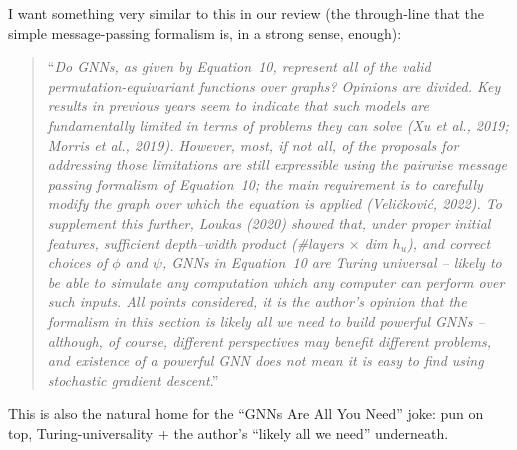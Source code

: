 I want something very similar to this in our review (the through-line that
the simple message-passing formalism is, in a strong sense, enough):
\begin{quote}
``\emph{Do GNNs, as given by Equation~10, represent all of the valid
permutation-equivariant functions over graphs? Opinions are divided. Key
results in previous years seem to indicate that such models are fundamentally
limited in terms of problems they can solve (Xu et al., 2019; Morris et al.,
2019). However, most, if not all, of the proposals for addressing those
limitations are still expressible using the pairwise message passing formalism
of Equation~10; the main requirement is to carefully modify the graph over
which the equation is applied (Veli\v{c}kovi\'c, 2022). To supplement this
further, Loukas (2020) showed that, under proper initial features, sufficient
depth--width product (\#layers $\times$ dim $h_u$), and correct choices of
$\phi$ and $\psi$, GNNs in Equation~10 are Turing universal -- likely to be
able to simulate any computation which any computer can perform over such
inputs. All points considered, it is the author's opinion that the formalism
in this section is likely all we need to build powerful GNNs -- although, of
course, different perspectives may benefit different problems, and existence of
a powerful GNN does not mean it is easy to find using stochastic gradient
descent}.''
\end{quote}
This is also the natural home for the ``GNNs Are All You Need'' joke: pun on
top, Turing-universality + the author's ``likely all we need'' underneath.
